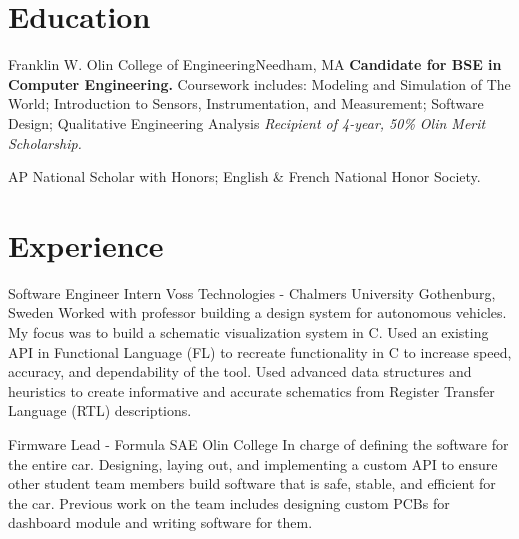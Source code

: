 \documentclass[11 pt]{moderncv}
\begin{document}
\maketitle

\vspace{-.6in}

\section{Education}

{Franklin W. Olin College of Engineering}{}{Needham, MA}{}
{
	\textbf{Candidate for BSE in Computer Engineering.}
	  Coursework includes:
    Modeling and Simulation of The World;
    Introduction to Sensors, Instrumentation, and Measurement;
    Software Design;
    Qualitative Engineering Analysis
	\newline
	\textit{Recipient of 4-year, 50\% Olin Merit Scholarship.}
}

{
	AP National Scholar with Honors; English \& French National Honor Society.
	\begin{flushright}
	\vspace {-0.3 in}
	\end{flushright}
	\vspace {-0.1 in}
}

\section{Experience}
\vspace{0.06 in}

{Software Engineer Intern}
{Voss Technologies - Chalmers University}
{Gothenburg, Sweden}
{}
{Worked with professor building a design system for autonomous vehicles. My focus was to build a schematic visualization system in C. Used an existing API in Functional Language (FL) to recreate functionality in C to increase speed, accuracy, and dependability of the tool. Used advanced data structures and heuristics to create informative and accurate schematics from Register Transfer Language (RTL) descriptions.}

{Firmware Lead - Formula SAE}
{Olin College}
{}
{}
{In charge of defining the software for the entire car. Designing, laying out, and implementing a custom API to ensure other student team members build software that is safe, stable, and efficient for the car. Previous work on the team includes designing custom PCBs for dashboard module and writing software for them.}
\end{document}
